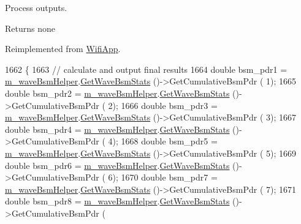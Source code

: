 Process outputs. 

\begin{DoxyReturn}{Returns}
none 
\end{DoxyReturn}


Reimplemented from \hyperlink{classWifiApp_af0f4fc85e025789248d1652acb556f4a}{Wifi\+App}.


\begin{DoxyCode}
1662 \{
1663   \textcolor{comment}{// calculate and output final results}
1664   \textcolor{keywordtype}{double} bsm\_pdr1 = \hyperlink{classVanetRoutingExperiment_a690b550804fc4c9bcfab6b8ae40e4728}{m\_waveBsmHelper}.\hyperlink{classns3_1_1WaveBsmHelper_a7b7442d597cc104a22c8c4bef6c98c6e}{GetWaveBsmStats} ()->GetCumulativeBsmPdr (
      1);
1665   \textcolor{keywordtype}{double} bsm\_pdr2 = \hyperlink{classVanetRoutingExperiment_a690b550804fc4c9bcfab6b8ae40e4728}{m\_waveBsmHelper}.\hyperlink{classns3_1_1WaveBsmHelper_a7b7442d597cc104a22c8c4bef6c98c6e}{GetWaveBsmStats} ()->GetCumulativeBsmPdr (
      2);
1666   \textcolor{keywordtype}{double} bsm\_pdr3 = \hyperlink{classVanetRoutingExperiment_a690b550804fc4c9bcfab6b8ae40e4728}{m\_waveBsmHelper}.\hyperlink{classns3_1_1WaveBsmHelper_a7b7442d597cc104a22c8c4bef6c98c6e}{GetWaveBsmStats} ()->GetCumulativeBsmPdr (
      3);
1667   \textcolor{keywordtype}{double} bsm\_pdr4 = \hyperlink{classVanetRoutingExperiment_a690b550804fc4c9bcfab6b8ae40e4728}{m\_waveBsmHelper}.\hyperlink{classns3_1_1WaveBsmHelper_a7b7442d597cc104a22c8c4bef6c98c6e}{GetWaveBsmStats} ()->GetCumulativeBsmPdr (
      4);
1668   \textcolor{keywordtype}{double} bsm\_pdr5 = \hyperlink{classVanetRoutingExperiment_a690b550804fc4c9bcfab6b8ae40e4728}{m\_waveBsmHelper}.\hyperlink{classns3_1_1WaveBsmHelper_a7b7442d597cc104a22c8c4bef6c98c6e}{GetWaveBsmStats} ()->GetCumulativeBsmPdr (
      5);
1669   \textcolor{keywordtype}{double} bsm\_pdr6 = \hyperlink{classVanetRoutingExperiment_a690b550804fc4c9bcfab6b8ae40e4728}{m\_waveBsmHelper}.\hyperlink{classns3_1_1WaveBsmHelper_a7b7442d597cc104a22c8c4bef6c98c6e}{GetWaveBsmStats} ()->GetCumulativeBsmPdr (
      6);
1670   \textcolor{keywordtype}{double} bsm\_pdr7 = \hyperlink{classVanetRoutingExperiment_a690b550804fc4c9bcfab6b8ae40e4728}{m\_waveBsmHelper}.\hyperlink{classns3_1_1WaveBsmHelper_a7b7442d597cc104a22c8c4bef6c98c6e}{GetWaveBsmStats} ()->GetCumulativeBsmPdr (
      7);
1671   \textcolor{keywordtype}{double} bsm\_pdr8 = \hyperlink{classVanetRoutingExperiment_a690b550804fc4c9bcfab6b8ae40e4728}{m\_waveBsmHelper}.\hyperlink{classns3_1_1WaveBsmHelper_a7b7442d597cc104a22c8c4bef6c98c6e}{GetWaveBsmStats} ()->GetCumulativeBsmPdr (

\end{DoxyCode}
